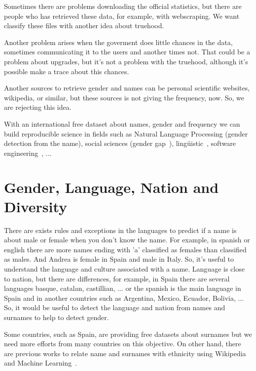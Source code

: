 \documentclass[a4paper]{article}
\begin{document}
Sometimes there are problems downloading the official statistics, but
there are people who has retrieved these data, for example, with
webscraping. We want classify these files with another idea about
truehood.

Another problem arises when the goverment does little chances in the
data, sometimes communicating it to the users and another times
not. That could be a problem about upgrades, but it's not a problem
with the truehood, although it's possible make a trace about this
chances.

Another sources to retrieve gender and names can be personal
scientific websites, wikipedia, or similar, but these sources is not
giving the frequency, now. So, we are rejecting this idea. 

With an international free dataset about names, gender and frequency
we can build reproducible science in fields such as Natural Language
Processing (gender detection from the name), social sciences (gender
gap~\cite{holman2018gender,mislove2011understanding}),
lingüistic~\cite{lawson2005russian,krueger1962mongolian,van2020gender,agyekum2006sociolinguistic,fraser1987lexicon},
software engineering~\cite{vasilescu2012gender}, ...


\section{Gender, Language, Nation and Diversity}
\label{sec:diversity}

There are exists rules and exceptions in the languages to predict if a
name is about male or female when you don't know the name. For
example, in spanish or english there are more names ending with 'a'
classified as females than classified as males. And Andrea is female
in Spain and male in Italy. So, it's useful to understand the language
and culture associated with a name. Language is close to nation, but
there are differences, for example, in Spain there are several
languages basque, catalan, castillian, ... or the spanish is the main
language in Spain and in another countries such as Argentina, Mexico,
Ecuador, Bolivia, ... So, it would be useful to detect the language
and nation from names and surnames to help to detect gender.

Some countries, such as Spain, are providing free datasets about
surnames but we need more efforts from many countries on this
objective. On other hand, there are previous works to relate name and
surnames with ethnicity using Wikipedia and Machine
Learning~\cite{ambekar2009name}.
\end{document}
